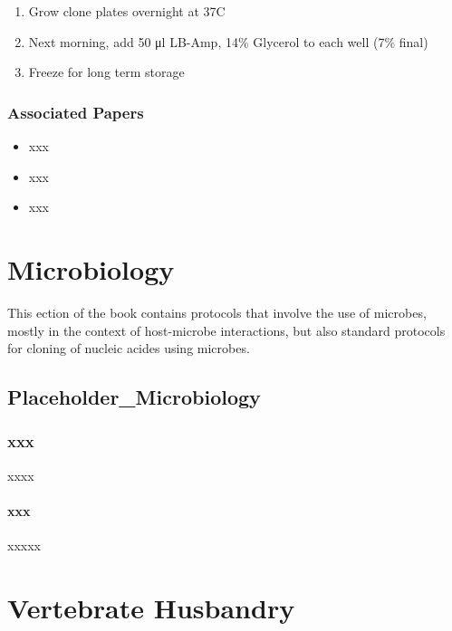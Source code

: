 \documentclass[
  letterpaper,
  DIV=11,
  numbers=noendperiod]{scrreprt}
\providecommand{\tightlist}{%
  \setlength{\itemsep}{0pt}\setlength{\parskip}{0pt}}\usepackage{longtable,booktabs,array}
\begin{document}
\begin{enumerate}
  \begin{enumerate}
  \def\labelenumii{\arabic{enumii}.}
  \tightlist
  \item
    Grow clone plates overnight at 37C
  \item
    Next morning, add 50 μl LB-Amp, 14\% Glycerol to each well (7\%
    final)
  \item
    Freeze for long term storage
  \end{enumerate}
\end{enumerate}

\hypertarget{associated-papers-15}{%
\section{Associated Papers}\label{associated-papers-15}}

\begin{itemize}
\tightlist
\item
  xxx
\item
  xxx
\item
  xxx
\end{itemize}

\part{Microbiology}

This ection of the book contains protocols that involve the use of
microbes, mostly in the context of host-microbe interactions, but also
standard protocols for cloning of nucleic acides using microbes.

\hypertarget{sec-microbiology}{%
\chapter{Placeholder\_Microbiology}\label{sec-microbiology}}

\hypertarget{xxx}{%
\section{xxx}\label{xxx}}

xxxx

\hypertarget{xxx-1}{%
\subsection{xxx}\label{xxx-1}}

xxxxx

\part{Vertebrate Husbandry}
\end{document}
